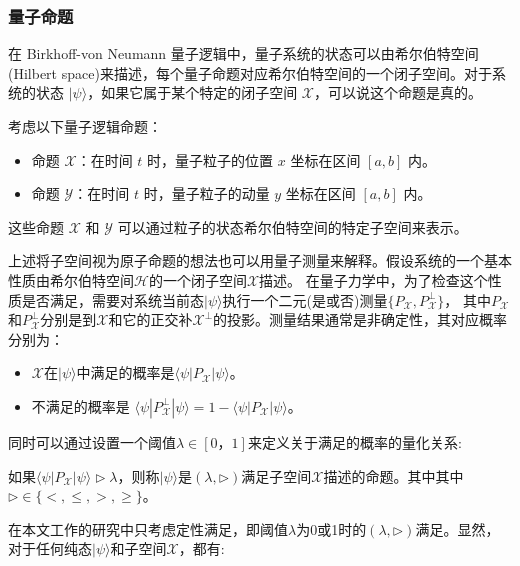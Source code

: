 \subsubsection*{量子命题}
\label{sec-logic}
在 Birkhoff-von Neumann 量子逻辑中，量子系统的状态可以由希尔伯特空间(Hilbert space)来描述，每个量子命题对应希尔伯特空间的一个闭子空间。对于系统的状态 \(|\psi\rangle\)，如果它属于某个特定的闭子空间 \( \mathcal{X} \)，可以说这个命题是真的。

\begin{example}
    考虑以下量子逻辑命题：

\begin{itemize}
\item 命题 \( \mathcal{X} \)：在时间 \( t \) 时，量子粒子的位置 \( x \) 坐标在区间 \( [a, b] \) 内。
\item 命题 \( \mathcal{Y} \)：在时间 \( t \) 时，量子粒子的动量 \( y \) 坐标在区间 \( [a, b] \) 内。
\end{itemize}
这些命题 \( \mathcal{X} \) 和 \( \mathcal{Y} \) 可以通过粒子的状态希尔伯特空间的特定子空间来表示。
\end{example}


上述将子空间视为原子命题的想法也可以用量子测量来解释。假设系统的一个基本性质由希尔伯特空间$\mathcal{H}$的一个闭子空间$\mathcal{X}$描述。
在量子力学中，为了检查这个性质是否满足，需要对系统当前态$|\psi\rangle$执行一个二元(是或否)测量$\{P_{\mathcal{X}}, P_{\mathcal{X}}^{\perp}\}$，
其中$P_{\mathcal{X}}$和$P_{\mathcal{X}}^\perp$分别是到$\mathcal{X}$和它的正交补$\mathcal{X}^\perp$的投影。测量结果通常是非确定性，其对应概率分别为：
\begin{itemize}
    \item $\mathcal{X}$在$|\psi\rangle$中满足的概率是$\langle\psi|P_{\mathcal{X}}|\psi\rangle$。
    \item 不满足的概率是
    $\langle\psi|P_{\mathcal{X}}^\perp|\psi\rangle = 1 - \langle\psi|P_{\mathcal{X}}|\psi\rangle$。
\end{itemize}
同时可以通过设置一个阈值$\lambda \in [0，1]$来定义关于满足的概率的量化关系:

\begin{definition}
    如果$\langle\psi|P_{\mathcal{X}}|\psi\rangle \rhd \lambda$，则称$|\psi\rangle$是$(\lambda, \rhd)$满足子空间$\mathcal{X}$描述的命题。其中其中$\rhd \in \{<, \leq, >, \geq\}$。 
\end{definition}

在本文工作的研究中只考虑定性满足，即阈值$\lambda$为0或1时的$(\lambda, \rhd)$满足。显然，对于任何纯态$|\psi\rangle$和子空间$\mathcal{X}$，都有:

